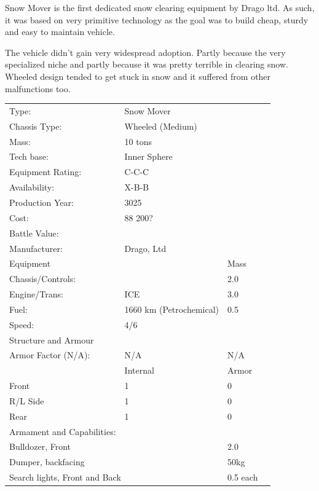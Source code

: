 \documentclass{tufte-book}
\begin{document}
Snow Mover is the first dedicated snow clearing equipment by Drago ltd. As
such, it was based on very primitive technology as the goal was to build
cheap, sturdy and easy to maintain vehicle.

The vehicle didn't gain very widespread adoption. Partly because the very
specialized niche and partly because it was pretty terrible in clearing
snow. Wheeled design tended to get stuck in snow and it suffered from
other malfunctions too.

\bigskip
\begin{minipage}{\textwidth}
\begin{center}
\begin{tabular}{llll}
\toprule
Type: & Snow Mover & \\
Chassis Type: & Wheeled (Medium) & \\
Mass: & 10 tons & \\
Tech base: & Inner Sphere & \\
Equipment Rating: & C-C-C & \\
Availability: & X-B-B & \\
Production Year: & 3025 & \\
Cost: & 88 200? & \\
Battle Value: & & \\
Manufacturer: & Drago, Ltd & \\
Equipment & & Mass \\
\quad Chassis/Controls: & & 2.0 \\
\quad Engine/Trans: & ICE  & 3.0 \\
\quad Fuel: & 1660 km (Petrochemical) & 0.5 \\
\quad Speed: & \multicolumn{2}{l}{4/6} \\
Structure and Armour & & \\
\quad Armor Factor (N/A): & N/A & N/A \\
\quad & Internal & Armor \\
\quad Front & 1 & 0 \\
\quad R/L Side & 1 & 0 \\
\quad Rear & 1 & 0 \\
Armament and Capabilities: & & \\
\multicolumn{2}{l}{\quad Bulldozer, Front} & 2.0 \\
\multicolumn{2}{l}{\quad Dumper, backfacing} & 50kg \\
\multicolumn{2}{l}{\quad 2 Search lights, Front and Back} & 0.5 each \\


\end{tabular}
\end{center}
\end{minipage}
\end{document}
